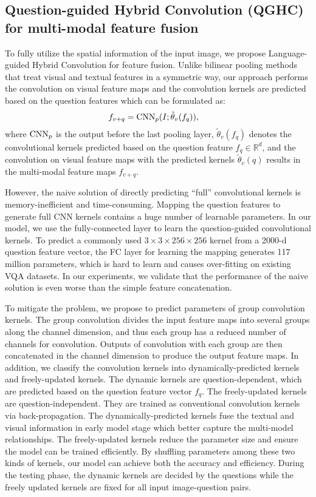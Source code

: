 \documentclass[runningheads]{llncs}
\begin{document}
\subsection{Question-guided Hybrid Convolution (QGHC) for multi-modal feature fusion}
\label{sec:problem1}

To fully utilize the spatial information of the input image, we propose Language-guided Hybrid Convolution for feature fusion. Unlike bilinear pooling methods that treat visual and textual features in a symmetric way, our approach performs the convolution on visual feature maps and the convolution kernels are predicted based on the question features which can be formulated as:
\begin{align}
  f_{v+q} &= \textnormal{CNN}_p ( I; \tilde{\theta}_v(f_q)) \label{eq:naive},
\end{align}
where $\textnormal{CNN}_p$ is the output before the last pooling layer, $\tilde{\theta}_v(f_q)$ denotes the convolutional kernels predicted based on the question feature $f_q \in \mathbb{R}^d$, and the convolution on visual feature maps with the predicted kernels $\tilde{\theta}_v(q)$ results in the multi-modal feature maps $f_{v+q}$.

However, the naive solution of directly predicting ``full'' convolutional kernels is memory-inefficient and time-consuming. Mapping the question features to generate full CNN kernels contains a huge number of learnable parameters. In our model, we use the fully-connected layer to learn the question-guided convolutional kernels. To predict a commonly used $3\times 3 \times 256 \times 256$ kernel from a 2000-d question feature vector, the FC layer for learning the mapping generates 117 million parameters, which is hard to learn and causes over-fitting on existing VQA datasets. In our experiments, we validate that the performance of the naive solution is even worse than the simple feature concatenation.

To mitigate the problem, we propose to predict parameters of group convolution kernels. The group convolution divides the input feature maps into several groups along the channel dimension, and thus each group has a reduced number of channels for convolution. Outputs of convolution with each group are then concatenated in the channel dimension to produce the output feature maps. In addition, we classify the convolution kernels into dynamically-predicted kernels and freely-updated kernels. The dynamic kernels are question-dependent, which are predicted based on the question feature vector $f_q$. The freely-updated kernels are question-independent. They are trained as conventional convolution kernels via back-propagation. The dynamically-predicted kernels fuse the textual and visual information in early model stage which better capture the multi-model relationships. The freely-updated kernels reduce the parameter size and ensure the model can be trained efficiently. By shuffling parameters among these two kinds of kernels, our model can achieve both the accuracy and efficiency.
During the testing phase, the dynamic kernels are decided by the questions while the freely updated kernels are fixed for all input image-question pairs.
\end{document}
